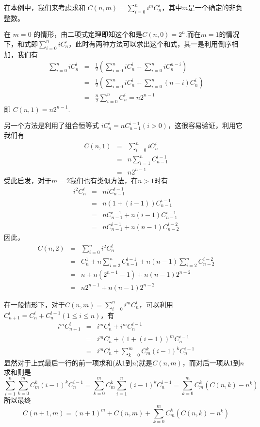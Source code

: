 \begin{example}[一类与组合数有关的和式]
  在本例中，我们来考虑求和 $C(n,m)=\sum\limits_{i=0}^n i^mC_n^i$，其中$m$是一个确定的非负整数。

  在 $m=0$ 的情形，由二项式定理即知这个和是$C(n,0)=2^n$.而在$m=1$的情况下，和式即$\sum\limits_{i=0}^niC_n^i$，此时有两种方法可以求出这个和式，其一是利用倒序相加，我们有
  \begin{eqnarray*}
    \sum_{i=0}^n iC_n^i & = & \frac{1}{2} \left( \sum_{i=0}^n iC_n^i + \sum_{i=0}^n iC_n^{n-i} \right) \\
                        & = & \frac{1}{2} \left( \sum_{i=0}^n iC_n^i + \sum_{i=0}^n (n-i)C_n^i \right) \\
    & = & \frac{n}{2} \sum_{i=0}^nC_n^i = n 2^{n-1}
  \end{eqnarray*}
  即 $C(n,1)=n 2^{n-1}$.

  另一个方法是利用了组合恒等式 $iC_n^i = nC_{n-1}^{i-1}(i>0)$，这很容易验证，利用它我们有
  \begin{eqnarray*}
    C(n,1) & = & \sum_{i=0}^n iC_n^i \\
           & = & n\sum_{i=1}^n C_{n-1}^{i-1} \\
    & = & n 2^{n-1}
  \end{eqnarray*}
  受此启发，对于$m=2$我们也有类似方法，在$n>1$时有
  \begin{eqnarray*}
    i^2C_n^i & = & n i C_{n-1}^{i-1} \\
             & = & n (1+(i-1)) C_{n-1}^{i-1} \\
             & = & n C_{n-1}^{i-1} + n(i-1)C_{n-1}^{i-1} \\
    & = & nC_{n-1}^{i-1} + n(n-1)C_{n-2}^{i-2}
  \end{eqnarray*}
  因此，
  \begin{eqnarray*}
    C(n,2) & = & \sum_{i=0}^n i^2C_n^i \\
           & = & C_n^1 + n\sum_{i=2}^nC_{n-1}^{i-1} + n(n-1)\sum_{i=2}^nC_{n-2}^{i-2} \\
           & = & n + n(2^{n-1}-1)+n(n-1)2^{n-2} \\
    & = & n 2^{n-1} + n(n-1)2^{n-2}
  \end{eqnarray*}

  在一般情形下，对于$C(n,m)=\sum\limits_{i=0}^ni^mC_n^i$，可以利用$C_{n+1}^i=C_n^i+C_n^{i-1}(1 \leqslant i \leqslant n)$，有
  \begin{eqnarray*}
    i^mC_{n+1}^i & = & i^mC_n^i + i^mC_n^{i-1} \\
                 & = & i^mC_n^i + (1+(i-1))^m C_n^{i-1} \\
    & = & i^mC_n^i + \sum_{k=0}^m C_m^k(i-1)^kC_n^{i-1}
  \end{eqnarray*}
  显然对于上式最后一行的前一项求和(从1到$n$)就是$C(n,m)$，而对后一项从1到$n$求和则是
  \[ \sum_{i=1}^n \sum_{k=0}^mC_m^k(i-1)^kC_n^{i-1} = \sum_{k=0}^m C_m^k \sum_{i=1}^n (i-1)^kC_n^{i-1}=\sum_{k=0}^m C_m^k (C(n,k)-n^k) \]
  所以最终
  \[ C(n+1,m)=(n+1)^m + C(n,m) + \sum_{k=0}^m C_m^k (C(n,k)-n^k) \]
\end{example}

